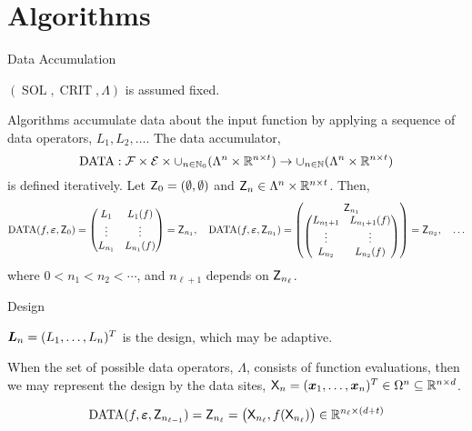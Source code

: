 \documentclass[10pt,compress,xcolor={usenames,dvipsnames},aspectratio=169]{beamer}
\DeclareMathOperator{\DATA}{DATA}
\DeclareMathOperator{\SOL}{SOL}
\DeclareMathOperator{\CRIT}{CRIT}
\begin{document}
\section{Algorithms}

\begin{frame}{Data Accumulation}

\vspace{-4ex}

$(\SOL, \CRIT, \Lambda)$ is assumed fixed.

Algorithms accumulate data about the input function by applying a sequence of data operators, $L_1, L_2, \ldots$.  The \alert{data accumulator},
\[
\DATA: \cf \times  \ce \times\cup_{n \in \natzero} (\Lambda^n \times \reals^{n\times t} ) \to  \cup_{n \in \naturals} (\Lambda^n \times \reals^{n\times t})
\]
is defined iteratively.  Let $\mathsf{Z}_0 = (\emptyset, \emptyset)$ and $\mathsf{Z}_n \in \Lambda^n \times \mathbb{R}^{n\times t}$.  Then,
\[
\DATA(f,\veps, \mZ_0) = \begin{pmatrix} L_{1} & L_{1}(f) \\ \vdots & \vdots \\ L_{n_1} & L_{n_1}(f) \end{pmatrix} = \mZ_{n_1}, \quad 
\DATA(f, \veps,\mZ_{n_1}) = 
\begin{pmatrix}\mZ_{n_1} \\ \begin{pmatrix} L_{n_1+1} & L_{n_1+1}(f) \\ \vdots & \vdots \\ L_{n_2} & L_{n_2}(f) \end{pmatrix}  \end{pmatrix} = \mZ_{n_2}, \quad \ldots
\]
where $0 < n_1 < n_2 < \cdots$, and $n_{\ell+1}$ depends on $\mathsf{Z}_{n_\ell}$.  

\end{frame}


\begin{frame}{Design}
	

$\boldsymbol{L}_n = (L_1, \ldots, L_n)^T$ is the \alert{design}, which may be \alert{adaptive}.
	
When the set of possible data operators, $\Lambda$, consists of function evaluations, then we may represent the design by the data sites, $\mathsf{X}_n = (\boldsymbol{x}_1, \ldots, \boldsymbol{x}_n)^T \in \Omega^n \subseteq \mathbb{R}^{n \times d}$.


\[
\DATA(f,\veps,\mZ_{n_{\ell-1}}) = \mZ_{n_{\ell}} = \bigl(\mX_{n_{\ell}}, f(\mX_{n_{\ell}}) \bigr)  \in  \reals^{n_\ell \times (d+t)}
\]

	
\end{frame}
\end{document}
